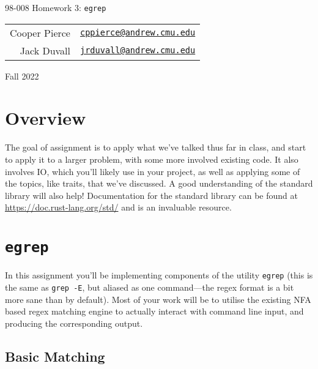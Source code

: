 \documentclass{article}
\newcommand{\longsemester}{Fall 2022}
\newcommand{\deptcode}{98}
\newcommand{\coursecode}{008}
\newcommand{\fullcoursecode}{\deptcode-\coursecode}
\begin{document}
\thispagestyle{empty}
\begin{center}
    \begin{minipage}{.85\textwidth}
        \centering
        {\huge {\fullcoursecode} Homework 3: \texttt{egrep}}

        \vspace{1em}

        \begin{tabular}{@{}rl@{}}
            Cooper Pierce & \href{mailto:cppierce@andrew.cmu.edu}{\texttt{cppierce@andrew.cmu.edu}} \\
            Jack Duvall & \href{mailto:jrduvall@andrew.cmu.edu}{\texttt{jrduvall@andrew.cmu.edu}} \\
        \end{tabular}

        \vspace{1em}

        \longsemester
    \end{minipage}
\end{center}

\section*{Overview}

The goal of assignment is to apply what we've talked thus far in class, and
start to apply it to a larger problem, with some more involved existing code. It
also involves IO, which you'll likely use in your project, as well as applying
some of the topics, like traits, that we've discussed. A good understanding of
the standard library will also help! Documentation for the standard library can
be found at \url{https://doc.rust-lang.org/std/} and is an invaluable resource.

\section*{\texttt{egrep}}

In this assignment you'll be implementing components of the utility
\texttt{egrep} (this is the same as \texttt{grep -E}, but aliased as one
command---the regex format is a bit more sane than by default). Most of your
work will be to utilise the existing NFA based regex matching engine to actually
interact with command line input, and producing the corresponding output.

\subsection*{Basic Matching} 
\end{document}
